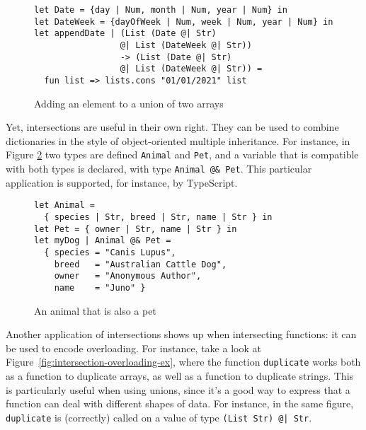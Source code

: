 \documentclass[sigplan,10pt]{acmart}
\newcommand{\unsure}[2][1=]{}
\newcommand{\nickel}[1]{\lstinline[language=nickel]{#1}}
\begin{document}
\begin{figure}[h]
\begin{lstlisting}[language=Nickel]
let Date = {day | Num, month | Num, year | Num} in
let DateWeek = {dayOfWeek | Num, week | Num, year | Num} in
let appendDate | (List (Date @| Str)
                 @| List (DateWeek @| Str))
                 -> (List (Date @| Str)
                 @| List (DateWeek @| Str)) =
  fun list => lists.cons "01/01/2021" list
\end{lstlisting}
\caption{Adding an element to a union of two arrays}
\label{fig:addElem}
\end{figure}

Yet, intersections are useful in their own right. They can be used to
combine dictionaries in the style of object-oriented multiple inheritance. For instance, in
Figure \ref{fig:intersection-record} two types are defined
\nickel{Animal} and \nickel{Pet}, and a variable that is compatible
with both types is declared, with type \nickel{Animal @& Pet}. This
particular application is supported, for instance, by TypeScript.

\begin{figure}[h]
\begin{lstlisting}[language=nickel]
let Animal =
  { species | Str, breed | Str, name | Str } in
let Pet = { owner | Str, name | Str } in
let myDog | Animal @& Pet =
  { species = "Canis Lupus",
    breed   = "Australian Cattle Dog",
    owner   = "Anonymous Author",
    name    = "Juno" }
\end{lstlisting}
\caption{An animal that is also a pet}
\label{fig:intersection-record}
\end{figure}

\unsure{Maybe it's better to give it in Typescript syntax?
left it commented just in case}



Another application of intersections shows up when intersecting
functions: it can be used to encode overloading.
For instance, take a look at Figure~\ref{fig:intersection-overloading-ex}, where the function
\nickel{duplicate} works both as a function to duplicate
arrays, as well as a function to duplicate strings.
This is particularly useful when using unions, since it's a
good way to express that a function can deal with different
shapes of data.
For instance, in the same figure, \nickel{duplicate} is (correctly) called
on a value of type \nickel{(List Str) @| Str}.
\end{document}

